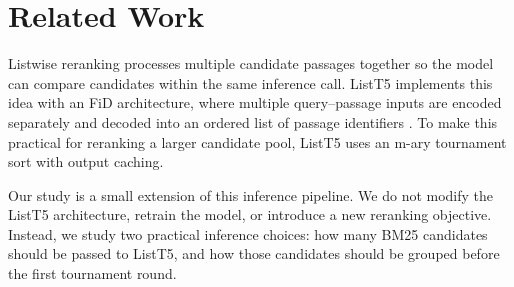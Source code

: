 \section{Related Work}
\label{sec:related-work}

Listwise reranking processes multiple candidate passages together so the model can compare candidates within the same inference call.
ListT5 implements this idea with an FiD architecture, where multiple query--passage inputs are encoded separately and decoded into an ordered list of passage identifiers \citep{izacard2021leveraging,yoon2024listt5}.
To make this practical for reranking a larger candidate pool, ListT5 uses an m-ary tournament sort with output caching.

Our study is a small extension of this inference pipeline.
We do not modify the ListT5 architecture, retrain the model, or introduce a new reranking objective.
Instead, we study two practical inference choices: how many BM25 candidates should be passed to ListT5, and how those candidates should be grouped before the first tournament round.
